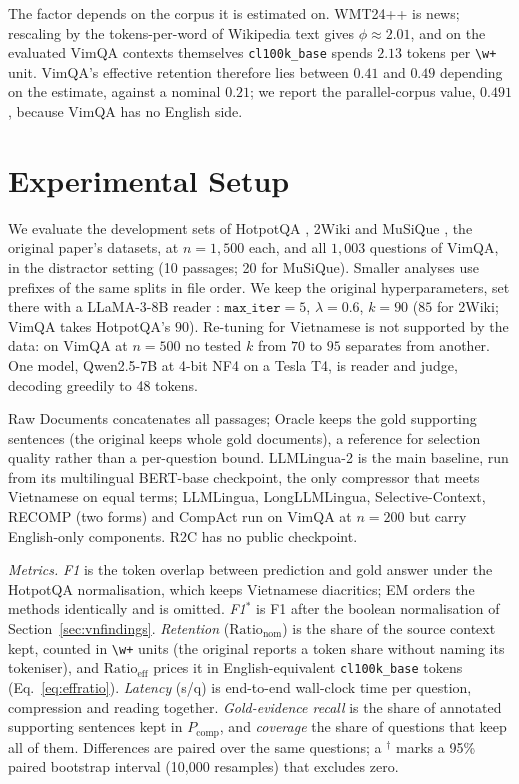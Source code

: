 \documentclass[runningheads]{llncs}
\begin{document}
The factor depends on the corpus it is estimated on. WMT24++ is news; rescaling
by the tokens-per-word of Wikipedia text gives $\phi\approx2.01$, and on the
evaluated VimQA contexts themselves \texttt{cl100k\_base} spends $2.13$ tokens per
\texttt{\textbackslash w+} unit. VimQA's effective retention therefore lies
between $0.41$ and $0.49$ depending on the estimate, against a nominal $0.21$; we
report the parallel-corpus value, $0.491$, because VimQA has no English side.

\section{Experimental Setup}
\label{sec:setup}
We evaluate the development sets of HotpotQA \cite{yang2018hotpotqa}, 2Wiki
\cite{ho2020constructing} and MuSiQue \cite{trivedi2022musique}, the original
paper's datasets, at $n=1{,}500$ each, and all $1{,}003$ questions of VimQA, in
the distractor setting (10 passages; 20 for MuSiQue). Smaller analyses use
prefixes of the same splits in file order. We keep the original hyperparameters,
set there with a LLaMA-3-8B reader \cite{grattafiori2024llama3}:
$\texttt{max\_iter}=5$, $\lambda=0.6$, $k=90$ ($85$ for 2Wiki; VimQA takes
HotpotQA's $90$). Re-tuning for Vietnamese is not supported by the data: on VimQA
at $n=500$ no tested $k$ from $70$ to $95$ separates from another. One model,
Qwen2.5-7B \cite{qwen2025qwen25} at 4-bit NF4 on a Tesla T4, is reader and judge,
decoding greedily to 48 tokens.

Raw Documents concatenates all passages; Oracle keeps the gold supporting
sentences (the original keeps whole gold documents), a reference for selection
quality rather than a per-question bound.
LLMLingua-2 is the main baseline, run from its multilingual BERT-base
checkpoint, the only compressor that meets
Vietnamese on equal terms; LLMLingua, LongLLMLingua, Selective-Context, RECOMP
(two forms) and CompAct run on VimQA at $n=200$ but carry English-only
components. R2C has no public checkpoint.

\emph{Metrics.} \emph{F1} is the token overlap between prediction and gold
answer under the HotpotQA normalisation, which keeps Vietnamese diacritics; EM
orders the methods identically and is omitted. \emph{F1$^*$} is F1 after the
boolean normalisation of Section~\ref{sec:vnfindings}. \emph{Retention}
($\text{Ratio}_{\text{nom}}$) is the share of the source context kept, counted in
\texttt{\textbackslash w+} units (the original reports a token share without
naming its tokeniser), and
$\text{Ratio}_{\text{eff}}$ prices it in English-equivalent
\texttt{cl100k\_base} tokens (Eq.~\ref{eq:effratio}). \emph{Latency} (s/q) is
end-to-end wall-clock time per question, compression and reading together.
\emph{Gold-evidence recall} is the share of annotated supporting sentences kept
in $P_{\text{comp}}$, and \emph{coverage} the share of questions that keep all
of them. Differences are paired over the same questions; a $^\dag$ marks a 95\%
paired bootstrap interval (10,000 resamples) that excludes zero.
\end{document}
